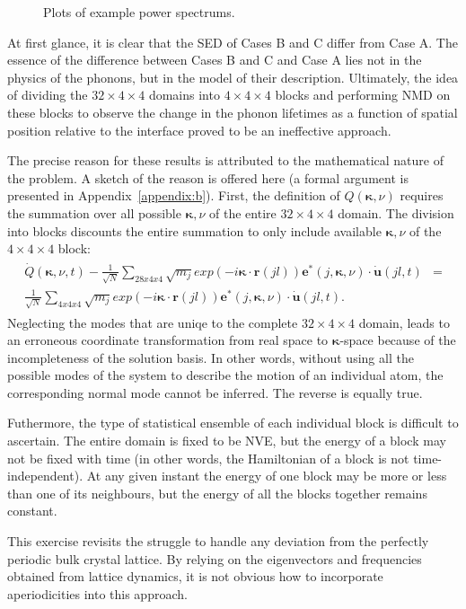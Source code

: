 \begin{figure*}%
\begin{center}
\renewcommand{\figure}{Fig.}
\caption{Plots of example power spectrums.}
\label{fig:sed}
\end{center}
\end{figure*}
At first glance, it is clear that the SED of Cases B and C differ from Case A. The essence of the difference between Cases B and C and Case A lies not in the physics of the phonons, but in the model of their description. Ultimately, the idea of dividing the $32\times4\times4$ domains into $4\times4\times4$ blocks and performing NMD on these blocks to observe the change in the phonon lifetimes as a function of spatial position relative to the interface proved to be an ineffective approach.

The precise reason for these results is attributed to the mathematical nature of the problem. A sketch of the reason is offered here (a formal argument is presented in Appendix~\ref{appendix:b}). First, the definition of $Q(\bm{\kappa},\nu)$ requires the summation over all possible $\bm{\kappa},\nu$ of the entire $32\times4\times4$ domain. The division into blocks discounts the entire summation to only include available $\bm{\kappa},\nu$ of the $4\times4\times4$ block:
\begin{eqnarray}
\begin{split}
\dot{Q}(\bm{\kappa},\nu,t)-\frac{1}{\sqrt{N}}\sum_{28x4x4}\sqrt{m_j}exp(-i\bm{\kappa}\cdot\bm{r}(jl))\bm{e}^*(j,\bm{\kappa},\nu)\cdot\dot{\bm{u}}(jl,t)&=\\\frac{1}{\sqrt{N}}\sum_{4x4x4}\sqrt{m_j}exp(-i\bm{\kappa}\cdot\bm{r}(jl))\bm{e}^*(j,\bm{\kappa},\nu)\cdot\dot{\bm{u}}(jl,t).
\end{split}
\end{eqnarray}
Neglecting the modes that are uniqe to the complete $32\times4\times4$ domain, leads to an erroneous coordinate transformation from real space to $\pmb{\kappa}$-space because of the incompleteness of the solution basis. In other words, without using all the possible modes of the system to describe the motion of an individual atom, the corresponding normal mode cannot be inferred. The reverse is equally true.

Futhermore, the type of statistical ensemble of each individual block is difficult to ascertain. The entire domain is fixed to be NVE, but the energy of a block may not be fixed with time (in other words, the Hamiltonian of a block is not time-independent). At any given instant the energy of one block may be more or less than one of its neighbours, but the energy of all the blocks together remains constant.

This exercise revisits the struggle to handle any deviation from the perfectly periodic bulk crystal lattice. By relying on the eigenvectors and frequencies obtained from lattice dynamics, it is not obvious how to incorporate aperiodicities into this approach.


